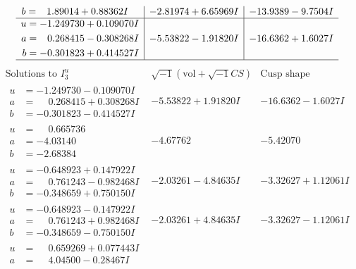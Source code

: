 \documentclass[1p]{elsarticle_modified}
\theoremstyle{definition}
\newcommand{\I}{\sqrt{-1}}
\begin{document}
$$\begin{array}{c|c|c}
\begin{aligned}
b &= \phantom{-}1.89014 + 0.88362 I\end{aligned}
 & -2.81974 + 6.65969 I & -13.9389 - 9.7504 I \\ \hline\begin{aligned}
u &= -1.249730 + 0.109070 I \\
a &= \phantom{-}0.268415 - 0.308268 I \\
b &= -0.301823 + 0.414527 I\end{aligned}
 & -5.53822 - 1.91820 I & -16.6362 + 1.6027 I\\
 \hline 
 \end{array}$$\newpage$$\begin{array}{c|c|c}  
\text{Solutions to }I^u_{3}& \I (\text{vol} + \sqrt{-1}CS) & \text{Cusp shape}\\
 \hline 
\begin{aligned}
u &= -1.249730 - 0.109070 I \\
a &= \phantom{-}0.268415 + 0.308268 I \\
b &= -0.301823 - 0.414527 I\end{aligned}
 & -5.53822 + 1.91820 I & -16.6362 - 1.6027 I \\ \hline\begin{aligned}
u &= \phantom{-}0.665736\phantom{ +0.000000I} \\
a &= -4.03140\phantom{ +0.000000I} \\
b &= -2.68384\phantom{ +0.000000I}\end{aligned}
 & -4.67762\phantom{ +0.000000I} & -5.42070\phantom{ +0.000000I} \\ \hline\begin{aligned}
u &= -0.648923 + 0.147922 I \\
a &= \phantom{-}0.761243 - 0.982468 I \\
b &= -0.348659 + 0.750150 I\end{aligned}
 & -2.03261 - 4.84635 I & -3.32627 + 1.12061 I \\ \hline\begin{aligned}
u &= -0.648923 - 0.147922 I \\
a &= \phantom{-}0.761243 + 0.982468 I \\
b &= -0.348659 - 0.750150 I\end{aligned}
 & -2.03261 + 4.84635 I & -3.32627 - 1.12061 I \\ \hline\begin{aligned}
u &= \phantom{-}0.659269 + 0.077443 I \\
a &= \phantom{-}4.04500 - 0.28467 I \\

\end{aligned}
\end{array}$$
\end{document}
